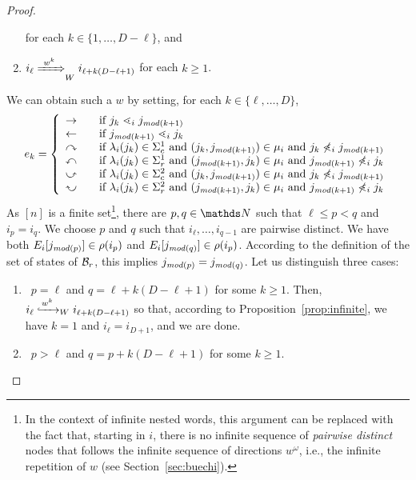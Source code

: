 \documentclass{LMCS}
\begin{document}
\begin{proof}
\begin{enumerate}[$\bullet$]
  for each $k \in \{1,\ldots,D-\ell\}$, and
\item $\Wleadstoeq{W}{w^k}{i_\ell}{i_{\ell + k(D - \ell + 1)}}$ for each $k \ge
  1$.
\end{enumerate}
We can obtain such a $w$ by setting, for each $k \in \{\ell,\ldots,D\}$,
\[
e_k = \left\{
    \begin{array}{cl}
      \rightarrow & ~~ \text{~if~} j_k \succrel_i j_{\modit(k+1)}\\
      \leftarrow & ~~ \text{~if~} j_{\modit(k+1)} \succrel_i j_k\\
      \rightone & ~~ \text{~if~} \lambda_i(j_k) \in \cSigma^1 \text{~and~}
      (j_k,j_{\modit(k+1)}) \in \mu_i
      \text{~and~} j_k \not\succrel_i j_{\modit(k+1)}\\
      \leftone & ~~ \text{~if~} \lambda_i(j_k) \in \rSigma^1 \text{~and~}
      (j_{\modit(k+1)},j_k) \in \mu_i
      \text{~and~} j_{\modit(k+1)} \not\succrel_i j_k\\
      \righttwo & ~~ \text{~if~} \lambda_i(j_k) \in \cSigma^2 \text{~and~}
      (j_k,j_{\modit(k+1)}) \in \mu_i
      \text{~and~} j_k \not\succrel_i j_{\modit(k+1)}\\
      \lefttwo & ~~ \text{~if~} \lambda_i(j_k) \in \rSigma^2 \text{~and~}
      (j_{\modit(k+1)},j_k) \in \mu_i
      \text{~and~} j_{\modit(k+1)} \not\succrel_i j_k
    \end{array}
\right.
\]
As $[n]$ is a finite set\footnote{\label{ftn:arg}In the context of infinite
  nested words, this argument can be replaced with the fact that, starting in
  $i$, there is no infinite sequence of \emph{pairwise distinct} nodes that
  follows the infinite sequence of directions $w^\omega$, i.e., the infinite
  repetition of $w$ (see Section~\ref{sec:buechi}).}, there are $p,q \in \N$
such that $\ell \le p < q$ and $i_p = i_q$. We choose $p$ and $q$ such that
$i_\ell,\ldots,i_{q-1}$ are pairwise distinct. We have both
$E_i[j_{\modit(p)}] \in \rho(i_p)$ and $E_i[j_{\modit(q)}] \in \rho(i_p)$.
According to the definition of the set of states of $\WA_\radius$, this
implies $j_{\modit(p)} = j_{\modit(q)}$. Let us distinguish three cases:
\begin{enumerate}
\item{}\ $p = \ell$ and $q = \ell + k(D - \ell + 1)$ for some $k \ge 1$.
  Then, $\Wleadsto{W}{w^k}{i_\ell}{i_{\ell + k(D - \ell + 1)}}$ so that,
  according to Proposition~\ref{prop:infinite}, we have $k=1$ and $i_\ell =
  i_{D+1}$, and we are done.
\item{}\ $p > \ell$ and $q = p + k(D - \ell + 1)$ for some $k \ge 1$.

\end{enumerate}
\end{proof}
\end{document}
